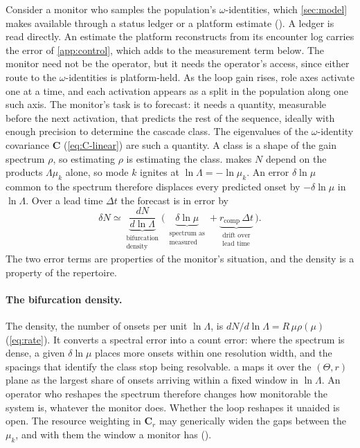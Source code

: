 \documentclass[
  aps,prx,
  reprint,
  superscriptaddress,
  nofootinbib,
  longbibliography
]{revtex4-2}
\newcommand{\C}{\mathbf{C}}
\newcommand{\Cr}{\mathbf{C}_r}
\newcommand{\rcomp}{r_{\mathrm{comp}}}
\newcommand{\smref}[1]{\cite[Sec.~#1]{SM}}
\begin{document}
\noindent Consider a monitor who samples the population's $\omega$-identities, which \cref{sec:model} makes available through a status ledger or a platform estimate (\smref{S4}). A ledger is read directly. An estimate the platform reconstructs from its encounter log carries the error of \cref{app:control}, which adds to the measurement term below. The monitor need not be the operator, but it needs the operator's access, since either route to the $\omega$-identities is platform-held. As the loop gain rises, role axes activate one at a time, and each activation appears as a split in the population along one such axis.
The monitor's task is to forecast: it needs a quantity, measurable before the next activation, that predicts the rest of the sequence, ideally with enough precision to determine the cascade class. The eigenvalues of the $\omega$-identity covariance $\C$ (\cref{eq:C-linear}) are such a quantity. A class is a shape of the gain spectrum $\rho$, so estimating $\rho$ is estimating the class.  makes $N$ depend on the products $\Lambda\mu_k$ alone, so mode $k$ ignites at $\ln\Lambda=-\ln\mu_k$. An error $\delta\ln\mu$ common to the spectrum therefore displaces every predicted onset by $-\delta\ln\mu$ in $\ln\Lambda$. Over a lead time $\Delta t$ the forecast is in error by
\begin{equation*}
\delta N\simeq\underbrace{\frac{dN}{d\ln\Lambda}}_{\substack{\text{bifurcation}\\[-1pt]\text{density}}}\bigl(\,\underbrace{\delta\ln\mu}_{\substack{\text{spectrum as}\\[-1pt]\text{measured}}}+\underbrace{\rcomp\,\Delta t}_{\substack{\text{drift over}\\[-1pt]\text{lead time}}}\,\bigr).
\end{equation*}
The two error terms are properties of the monitor's situation, and the density is a property of the repertoire.

\paragraph{The bifurcation density.} The density, the number of onsets per unit $\ln\Lambda$, is $dN/d\ln\Lambda=R\,\mu\rho(\mu)$ (\cref{eq:rate}). It converts a spectral error into a count error: where the spectrum is dense, a given $\delta\ln\mu$ places more onsets within one resolution width, and the spacings that identify the class stop being resolvable. a maps it over the $(\Theta,r)$ plane as the largest share of onsets arriving within a fixed window in $\ln\Lambda$. An operator who reshapes the spectrum therefore changes how monitorable the system is, whatever the monitor does. Whether the loop reshapes it unaided is open. The resource weighting in $\Cr$ may generically widen the gaps between the $\mu_k$, and with them the window a monitor has (\smref{S8}).
\end{document}
